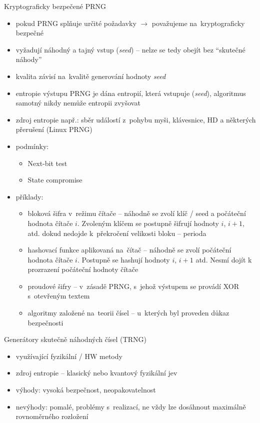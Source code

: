 Kryptograficky bezpečené PRNG
\begin{itemize}
    \item pokud PRNG splňuje určité požadavky $\rightarrow$ považujeme na~kryptograficky bezpečné
    \item vyžadují náhodný a tajný vstup (\emph{seed}) -- nelze se tedy obejít bez \enquote{skutečné náhody}
    \item kvalita závisí na~kvalitě generování hodnoty \emph{seed}
    \item entropie výstupu PRNG je dána entropií, která vstupuje (\emph{seed}), algoritmus samotný nikdy nemůže entropii zvyšovat
    \item zdroj entropie např.: sběr událostí z~pohybu myši, klávesnice, HD a některých přerušení (Linux PRNG)
    \item podmínky:
    \begin{itemize}
        \item Next-bit test
        \item State compromise
    \end{itemize}
    \item příklady:
    \begin{itemize}
        \item bloková šifra v~režimu čítače -- náhodně se zvolí klíč / seed a počáteční hodnota čítače $i$. Zvoleným klíčem se postupně šifrují hodnoty $i$, $i+1$, atd. dokud nedojde k~překročení velikosti bloku -- perioda
        \item hashovací funkce aplikovaná na~čítač -- náhodně se zvolí počáteční hodnota čítače $i$. Postupně se hashují hodnoty $i$, $i+1$ atd. Nesmí dojít k prozrazení počáteční hodnoty čítače
        \item proudové šifry -- v~zásadě PRNG, s~jehož výstupem se provádí XOR s~otevřeným textem
        \item algoritmy založené na~teorii čísel -- u~kterých byl proveden důkaz bezpečnosti
    \end{itemize}
\end{itemize}

Generátory skutečně náhodných čísel (TRNG)
\begin{itemize}
    \item využívající fyzikální / HW metody
    \item zdroj entropie -- klasický nebo kvantový fyzikální jev
    \item výhody: vysoká bezpečnost, neopakovatelnost
    \item nevýhody: pomalé, problémy s~realizací, ne vždy lze dosáhnout maximálně rovnoměrného rozložení
\end{itemize}



